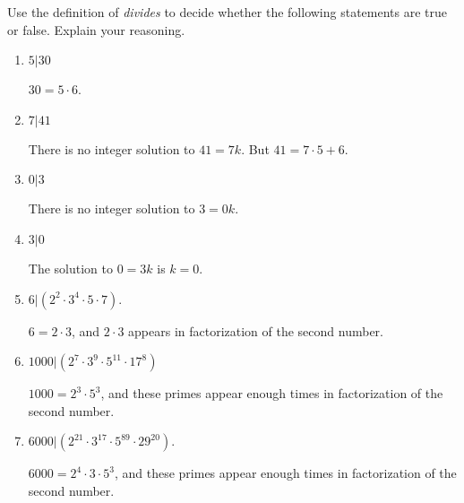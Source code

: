 \documentclass[nooutcomes]{ximera}
\begin{document}
\begin{problem}
Use the definition of \textit{divides} to decide whether the
  following statements are true or false. 
  Explain your reasoning. 
\begin{enumerate}
\item $5|30$  
  \begin{hint}$30=5\cdot6$.\end{hint}
\item $7|41$  
  \begin{hint}There is no integer solution to $41=7k$.  But $41=7\cdot5+6$. \end{hint}
\item $0|3$  
  \begin{hint}There is no integer solution to $3=0k$.\end{hint}
\item $3|0$ 
  \begin{hint}The solution to $0=3k$ is $k=0$.\end{hint}
\item $6|(2^2\cdot 3^4\cdot 5 \cdot 7)$. 
  \begin{hint} $6=2\cdot3$, and $2\cdot3$ appears in factorization of the second number.\end{hint}
\item $1000|(2^7\cdot 3^9\cdot 5^{11}\cdot 17^8)$ 
  \begin{hint} $1000 = 2^3\cdot5^3$, and these primes appear enough times in factorization of the second number.\end{hint}
\item $6000|(2^{21}\cdot 3^{17}\cdot 5^{89}\cdot 29^{20})$. 
  \begin{hint} $6000 = 2^4\cdot3\cdot5^3$, and these primes appear enough times in factorization of the second number.\end{hint}
\end{enumerate}
\end{problem}
\end{document}
